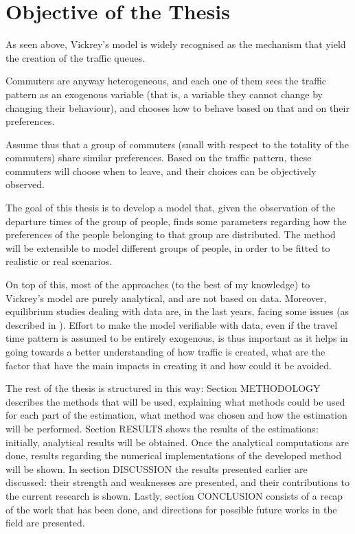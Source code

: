 \section{Objective of the Thesis}
\label{sec:thesis_obj}

As seen above,
Vickrey's model is widely recognised as the mechanism that yield the creation of the traffic queues.

Commuters are anyway heterogeneous,
and each one of them sees the traffic pattern as an exogenous variable
(that is, a variable they cannot change by changing their behaviour),
and chooses how to behave based on that and on their preferences.

Assume thus that a group of commuters (small with respect to the totality of the commuters) share similar preferences.
Based on the traffic pattern, these commuters will choose when to leave,
and their choices can be objectively observed.

The goal of this thesis is to develop a model that,
given the observation of the departure times of the group of people,
finds some parameters regarding how the preferences of the people belonging to that group are distributed.
The method will be extensible to model different groups of people,
in order to be fitted to realistic or real scenarios.

On top of this, most of the approaches (to the best of my knowledge) to Vickrey's model are purely analytical,
and are not based on data.
Moreover, equilibrium studies dealing with data are, in the last years, facing some issues (as described in \cite{https://doi.org/10.1111/iere.12692}).
Effort to make the model verifiable with data,
even if the travel time pattern is assumed to be entirely exogenous,
is thus important as it helps in going towards a better understanding of how traffic is created,
what are the factor that have the main impacts in creating it and how could it be avoided.

The rest of the thesis is structured in this way:
Section METHODOLOGY describes the methods that will be used,
explaining what methods could be used for each part of the estimation,
what method was chosen and how the estimation will be performed.
Section RESULTS shows the results of the estimations:
initially, analytical results will be obtained.
Once the analytical computations are done,
results regarding the numerical implementations of the developed method will be shown.
In section DISCUSSION the results presented earlier are discussed:
their strength and weaknesses are presented,
and their contributions to the current research is shown.
Lastly, section CONCLUSION consists of a recap of the work that has been done,
and directions for possible future works in the field are presented.

